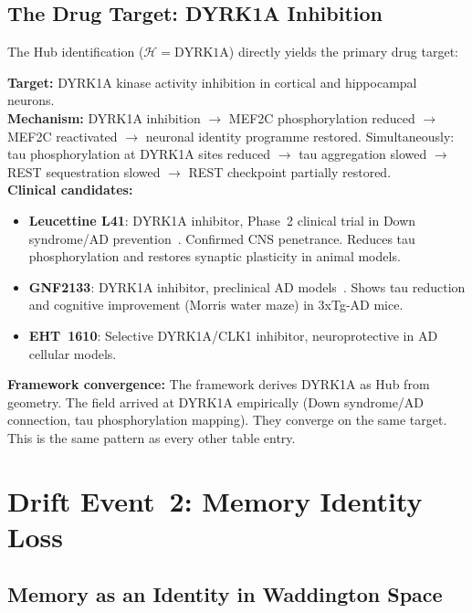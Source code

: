 \documentclass[12pt,a4paper]{article}
\newenvironment{predenv}[1]{%
  \begin{tcolorbox}[colback=blue!4,colframe=headerblue,boxrule=1pt,
    arc=3pt,title={\bfseries\color{white}#1},colbacktitle=headerblue,
    left=8pt,right=8pt,top=6pt,bottom=6pt,breakable]}{%
  \end{tcolorbox}}
\newcommand{\Hub}{\mathcal{H}}
\begin{document}
\subsection{The Drug Target: DYRK1A Inhibition}

The Hub identification ($\Hub = \text{DYRK1A}$) directly
yields the primary drug target:

\begin{predenv}{Drug Target: CNS-Penetrant DYRK1A
Inhibitor}
\textbf{Target:} DYRK1A kinase activity inhibition in
cortical and hippocampal neurons.\\[4pt]
\textbf{Mechanism:} DYRK1A inhibition $\to$ MEF2C
phosphorylation reduced $\to$ MEF2C reactivated $\to$
neuronal identity programme restored. Simultaneously:
tau phosphorylation at DYRK1A sites reduced $\to$ tau
aggregation slowed $\to$ REST sequestration slowed
$\to$ REST checkpoint partially restored.\\[4pt]
\textbf{Clinical candidates:}
\begin{itemize}
  \item \textbf{Leucettine L41}: DYRK1A inhibitor,
    Phase~2 clinical trial in Down syndrome/AD
    prevention~\cite{Leucettine2022}. Confirmed CNS
    penetrance. Reduces tau phosphorylation and
    restores synaptic plasticity in animal models.
  \item \textbf{GNF2133}: DYRK1A inhibitor, preclinical
    AD models~\cite{GNF21332023}. Shows tau reduction
    and cognitive improvement (Morris water maze) in
    3xTg-AD mice.
  \item \textbf{EHT~1610}: Selective DYRK1A/CLK1
    inhibitor, neuroprotective in AD cellular models.
\end{itemize}
\textbf{Framework convergence:} The framework derives
DYRK1A as Hub from geometry. The field arrived at
DYRK1A empirically (Down syndrome/AD connection,
tau phosphorylation mapping). They converge on the
same target. This is the same pattern as every
other table entry.
\end{predenv}

\section{Drift Event~2: Memory Identity Loss}

\subsection{Memory as an Identity in Waddington Space}
\end{document}
